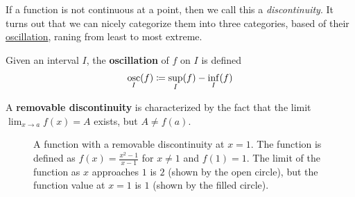   If a function is not continuous at a point, then we call this a \textit{discontinuity}. It turns out that we can nicely categorize them into three categories, based of their \hyperref[def:oscillation]{oscillation}, raning from least to most extreme. 

  \begin{definition}[Oscillation]
    \label{def:oscillation}
    Given an interval $I$, the \textbf{oscillation} of $f$ on $I$ is defined 
    \begin{equation}
      \mathop{\operatorname{osc}}_{I} (f) \coloneqq \sup_I (f) - \inf_I (f)
    \end{equation}
  \end{definition}

  \begin{definition}
    \label{def:removable-discontinuity}
    A \textbf{removable discontinuity} is characterized by the fact that the limit $\lim_{x \to a} f(x) = A$ exists, but $A \neq f(a)$. 

    \begin{figure}[H]
      \centering 
      \caption{A function with a removable discontinuity at $x=1$. The function is defined as $f(x) = \frac{x^2 - 1}{x - 1}$ for $x \neq 1$ and $f(1) = 1$. The limit of the function as $x$ approaches $1$ is $2$ (shown by the open circle), but the function value at $x=1$ is $1$ (shown by the filled circle).}
      \label{fig:removable-discontinuity}
    \end{figure}
  \end{definition}

